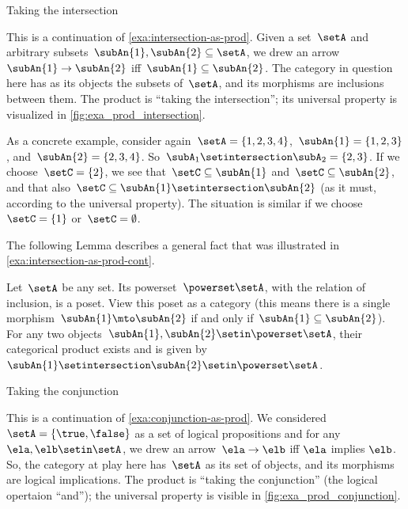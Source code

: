 \begin{marginfigure}
    \centering
    \caption{Taking the intersection}
    \label{fig:exa_prod_intersection_cont}
\end{marginfigure}

\begin{example}
    \label{exa:intersection-as-prod-cont}
    This is a continuation of \cref{exa:intersection-as-prod}.
    Given a set~$\setA$ and arbitrary subsets~$\subAn{1}, \subAn{2} \subseteq \setA$, we drew an arrow~$\subAn{1} \to \subAn{2}$ iff~$\subAn{1} \subseteq \subAn{2}$.
    The category in question here has as its objects the subsets of~$\setA$, and its morphisms are inclusions between them.
    The product is ``taking the intersection''; its universal property is visualized in \cref{fig:exa_prod_intersection}.

    As a concrete example, consider again~$\setA = \{ 1, 2, 3, 4 \}$,~$\subAn{1} = \{ 1, 2, 3 \}$, and~$\subAn{2} = \{2, 3, 4 \}$.
    So~$\subA_1 \setintersection \subA_2 = \{2, 3 \}$.
    If we choose~$\setC = \{ 2 \}$, we see that~$\setC \subseteq \subAn{1}$ and~$\setC \subseteq \subAn{2}$, and that also~$\setC \subseteq \subAn{1} \setintersection \subAn{2}$ (as it must, according to the universal property).
    The situation is similar if we choose~$\setC = \{ 1\}$ or~$\setC = \emptyset$.
\end{example}

The following Lemma describes a general fact that was illustrated in \cref{exa:intersection-as-prod-cont}.
\begin{lemma}
    \label{lem:cat-product-powerset}
    Let~$\setA$ be any set.
    Its powerset~$\powerset \setA$, with the relation of inclusion, is a poset.
    View this poset as a category (this means there is a single morphism~$\subAn{1} \mto \subAn{2}$ if and only if~$\subAn{1} \subseteq \subAn{2}$).
    For any two objects~$\subAn{1}, \subAn{2} \setin \powerset \setA$, their categorical product exists and is given by~$\subAn{1} \setintersection \subAn{2} \setin \powerset \setA$.
\end{lemma}

\begin{marginfigure}
    \centering
    \caption{Taking the conjunction}
    \label{fig:exa_prod_conjunction_cont}
\end{marginfigure}

\begin{example}
    \label{exa:conjunction-as-prod-cont}
    This is a continuation of \cref{exa:conjunction-as-prod}.
    We considered~$\setA = \{ \true, \false \}$ as a set of logical propositions and for any~$\ela, \elb  \setin \setA$, we drew an arrow~$\ela \to \elb$ iff $\ela$ implies $\elb$.
    So, the category at play here has~$\setA$ as its set of objects, and its morphisms are logical implications.
    The product is ``taking the conjunction'' (the logical opertaion ``and''); the universal property is visible in \cref{fig:exa_prod_conjunction}.

\end{example}

